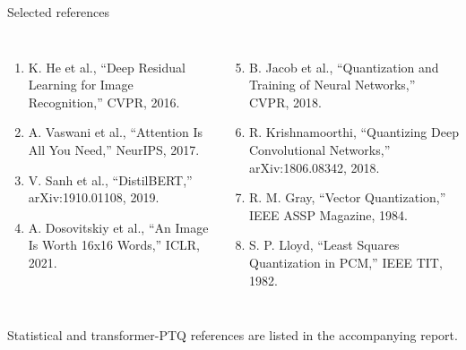 \documentclass[aspectratio=169,10pt]{beamer}
\begin{document}
\begin{frame}{Selected references}
\scriptsize
\begin{columns}[T,onlytextwidth]
\begin{enumerate}
  \item K. He et al., ``Deep Residual Learning for Image Recognition,'' CVPR, 2016.
  \item A. Vaswani et al., ``Attention Is All You Need,'' NeurIPS, 2017.
  \item V. Sanh et al., ``DistilBERT,'' arXiv:1910.01108, 2019.
  \item A. Dosovitskiy et al., ``An Image Is Worth 16x16 Words,'' ICLR, 2021.
\end{enumerate}
\begin{enumerate}\setcounter{enumi}{4}
  \item B. Jacob et al., ``Quantization and Training of Neural Networks,'' CVPR, 2018.
  \item R. Krishnamoorthi, ``Quantizing Deep Convolutional Networks,'' arXiv:1806.08342, 2018.
  \item R. M. Gray, ``Vector Quantization,'' IEEE ASSP Magazine, 1984.
  \item S. P. Lloyd, ``Least Squares Quantization in PCM,'' IEEE TIT, 1982.
\end{enumerate}
\end{columns}
\vspace{2mm}
\begin{center}\scriptsize Statistical and transformer-PTQ references are listed in the accompanying report.\end{center}
\end{frame}

\end{document}
